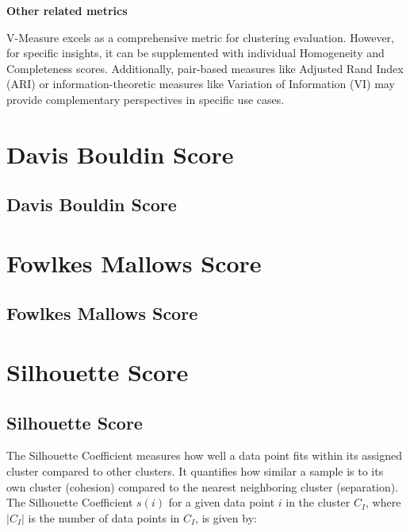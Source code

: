 \clearpage

\thispagestyle{customstyle}

\textbf{Other related metrics}

V-Measure excels as a comprehensive metric for clustering evaluation. However, for specific insights, it can be supplemented with
individual Homogeneity and Completeness scores. Additionally, pair-based measures like Adjusted Rand Index (ARI) or
information-theoretic measures like Variation of Information (VI) may provide complementary perspectives in specific use cases​.

\clearpage
\thispagestyle{clusteringstyle}
\section{Davis Bouldin Score}
\subsection{Davis Bouldin Score}

\clearpage
\thispagestyle{clusteringstyle}
\section{Fowlkes Mallows Score}
\subsection{Fowlkes Mallows Score}

\clearpage
\thispagestyle{clusteringstyle}
\section{Silhouette Score}
\subsection{Silhouette Score}

The Silhouette Coefficient measures how well a data point fits within its assigned cluster compared to other clusters. 
It quantifies how similar a sample is to its own cluster (cohesion) compared to the nearest neighboring cluster (separation).
The Silhouette Coefficient $s(i)$ for a given data point $i$ in the cluster $C_I$, where $|C_I|$ is the number of data points in $C_I$, is given by:

